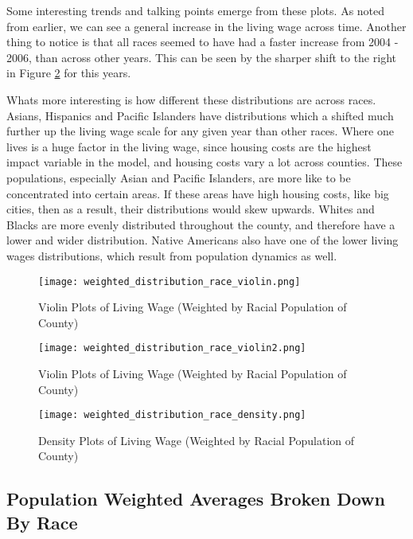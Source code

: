 Some interesting trends and talking points emerge from these plots. As noted from earlier, we can see a general increase in the living wage across time. Another thing to notice is that all races seemed to have had a faster increase from 2004 - 2006, than across other years. This can be seen by the sharper shift to the right in Figure \ref{f:ch4_weighted_distribution_race_violin2} for this years. 

Whats more interesting is how different these distributions are across races. Asians, Hispanics and Pacific Islanders have distributions which a shifted much further up the living wage scale for any given year than other races. Where one lives is a huge factor in the living wage, since housing costs are the highest impact variable in the model, and housing costs vary a lot across counties. These populations, especially Asian and Pacific Islanders, are more like to be concentrated into certain areas. If these areas have high housing costs, like big cities, then as a result, their distributions would skew upwards. Whites and Blacks are more evenly distributed throughout the county, and therefore have a lower and wider distribution. Native Americans also have one of the lower living wages distributions, which result from population dynamics as well.

\begin{figure}[H]
    \centering
        \texttt{[image: weighted\_distribution\_race\_violin.png]}
        \caption{Violin Plots of Living Wage (Weighted by Racial Population of County)}
    \label{f:ch4_weighted_distribution_race_violin}
\end{figure}

\begin{figure}[H]
    \centering
        \texttt{[image: weighted\_distribution\_race\_violin2.png]}
        \caption{Violin Plots of Living Wage (Weighted by Racial Population of County)}
    \label{f:ch4_weighted_distribution_race_violin2}
\end{figure}

\begin{figure}[H]
    \centering
        \texttt{[image: weighted\_distribution\_race\_density.png]}
        \caption{Density Plots of Living Wage (Weighted by Racial Population of County)}
    \label{f:ch4_weighted_distribution_race_density}
\end{figure}


\subsection{Population Weighted Averages Broken Down By Race}

